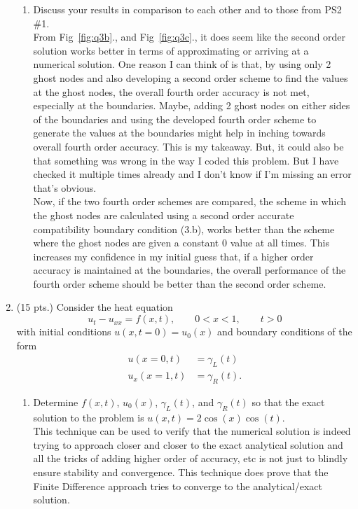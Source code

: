 \documentclass[11pt]{article}
\begin{document}
\begin{enumerate}
\begin{enumerate}
    \item {\color{blue}Discuss your results in comparison to each other and to those from PS2 \#1.} \\
    From Fig~\ref{fig:q3b}., and Fig~\ref{fig:q3c}., it does seem like the second order solution works better in terms of approximating or arriving at a numerical solution. One reason I can think of is that, by using only 2 ghost nodes and also developing a second order scheme to find the values at the ghost nodes, the overall fourth order accuracy is not met, especially at the boundaries. Maybe, adding 2 ghost nodes on either sides of the boundaries and using the developed fourth order scheme to generate the values at the boundaries might help in inching towards overall fourth order accuracy. This is my takeaway. But, it could also be that something was wrong in the way I coded this problem. But I have checked it multiple times already and I don't know if I'm missing an error that's obvious. \\
    Now, if the two fourth order schemes are compared, the scheme in which the ghost nodes are calculated using a second order accurate compatibility boundary condition (3.b), works better than the scheme where the ghost nodes are given a constant 0 value at all times. This increases my confidence in my initial guess that, if a higher order accuracy is maintained at the boundaries, the overall performance of the fourth order scheme should be better than the second order scheme. 
  \end{enumerate}
  
  \item(15 pts.) {\color{red}Consider the heat equation}
  \[
    u_t-u_{xx}=f(x,t), \qquad 0 < x < 1, \qquad t >0
  \]
  {\color{red}with initial conditions }$u(x,t=0)=u_0(x)$ {\color{red}and boundary conditions of the form}
  \begin{align*}
    u(x=0,t) & = \gamma_L(t)\\
    u_x(x=1,t) & = \gamma_R(t).
  \end{align*}
    
  \begin{enumerate}
  
    \item {\color{blue}Determine }$f(x,t)$, $u_0(x)$, $\gamma_L(t)${\color{blue}, and} $\gamma_R(t)$ {\color{blue}so that the exact solution to the problem is }$u(x,t)=2\cos(x)\cos(t)$. \\
    
    This technique can be used to verify that the numerical solution is indeed trying to approach closer and closer to the exact analytical solution and all the tricks of adding higher order of accuracy, etc is not just to blindly ensure stability and convergence. This technique does prove that the Finite Difference approach tries to converge to the analytical/exact solution.
    

\end{enumerate}
\end{enumerate}
\end{document}
